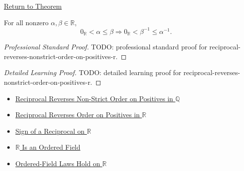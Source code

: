 \newpage
{}
\label{prf:reciprocal-reverses-nonstrict-order-on-positives-r}

\begin{remark*}[Return]
\hyperref[thm:reciprocal-reverses-nonstrict-order-on-positives-r]{Return to Theorem}
\end{remark*}

\begin{theorem*}
For all nonzero $\alpha,\beta\in\mathbb{R}$,
\[
0_{\mathbb{R}}<\alpha\le\beta
\Longrightarrow
0_{\mathbb{R}}<\beta^{-1}\le\alpha^{-1}.
\]
\end{theorem*}

\begin{proof}[Professional Standard Proof]
\LRAProofBodyStart
TODO: professional standard proof for reciprocal-reverses-nonstrict-order-on-positives-r.
\end{proof}

\begin{proof}[Detailed Learning Proof]
\LRAProofBodyStart
TODO: detailed learning proof for reciprocal-reverses-nonstrict-order-on-positives-r.
\end{proof}

\begin{remark*}
\end{remark*}

\begin{dependencies}
\begin{itemize}
  \item \hyperref[thm:reciprocal-reverses-nonstrict-order-on-positives-q]{Reciprocal Reverses Non-Strict Order on Positives in $\mathbb{Q}$}
  \item \hyperref[thm:reciprocal-reverses-order-on-positives-r]{Reciprocal Reverses Order on Positives in $\mathbb{R}$}
  \item \hyperref[thm:sign-of-reciprocal-r]{Sign of a Reciprocal on $\mathbb{R}$}
  \item \hyperref[thm:r-is-an-ordered-field]{$\mathbb{R}$ Is an Ordered Field}
  \item \hyperref[cor:ordered-field-laws-on-r]{Ordered-Field Laws Hold on $\mathbb{R}$}
\end{itemize}
\end{dependencies}

\clearpage
